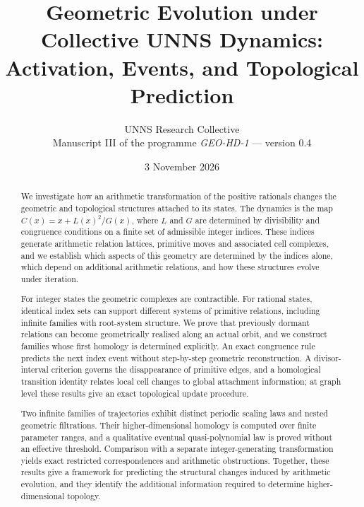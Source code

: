 \documentclass[11pt]{article}
\title{Geometric Evolution under Collective UNNS Dynamics:\\ Activation, Events, and Topological Prediction}
\author{UNNS Research Collective\\[2pt]\small Manuscript III of the programme \emph{GEO-HD-1} --- version 0.4}
\date{3 November 2026}
\theoremstyle{plain}
\theoremstyle{definition}
\theoremstyle{remark}
\begin{document}
\maketitle
\begin{abstract}
We investigate how an arithmetic transformation of the positive rationals changes the geometric and topological structures attached to its states. The dynamics is the map $C(x)=x+L(x)^2/G(x)$, where $L$ and $G$ are determined by divisibility and congruence conditions on a finite set of admissible integer indices. These indices generate arithmetic relation lattices, primitive moves and associated cell complexes, and we establish which aspects of this geometry are determined by the indices alone, which depend on additional arithmetic relations, and how these structures evolve under iteration.

For integer states the geometric complexes are contractible. For rational states, identical index sets can support different systems of primitive relations, including infinite families with root-system structure. We prove that previously dormant relations can become geometrically realised along an actual orbit, and we construct families whose first homology is determined explicitly. An exact congruence rule predicts the next index event without step-by-step geometric reconstruction. A divisor-interval criterion governs the disappearance of primitive edges, and a homological transition identity relates local cell changes to global attachment information; at graph level these results give an exact topological update procedure.

Two infinite families of trajectories exhibit distinct periodic scaling laws and nested geometric filtrations. Their higher-dimensional homology is computed over finite parameter ranges, and a qualitative eventual quasi-polynomial law is proved without an effective threshold. Comparison with a separate integer-generating transformation yields exact restricted correspondences and arithmetic obstructions. Together, these results give a framework for predicting the structural changes induced by arithmetic evolution, and they identify the additional information required to determine higher-dimensional topology.
\end{abstract}
\tableofcontents















\appendix






\end{document}
